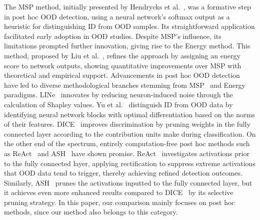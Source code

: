 The MSP method, initially presented by Hendrycks et al.~\cite{hendrycks2016msp}, was a formative step in post hoc OOD detection, using a neural network’s softmax output as a heuristic for distinguishing ID from OOD samples. Its straightforward application facilitated early adoption in OOD studies.
Despite MSP's influence, its limitations prompted further innovation, giving rise to the Energy method. This method, proposed by Liu et al.~\cite{liu2020energy}, refines the approach by assigning an energy score to network outputs, showing quantitative improvements over MSP with theoretical and empirical support.
Advancements in post hoc OOD detection have led to diverse methodological branches stemming from MSP~\cite{hendrycks2016baseline_confi} and Energy~\cite{liu2020energy} paradigms. LINe~\cite{ahn2023line} innovates by reducing neuron-induced noise through the calculation of Shapley values. Yu et al.~\cite{yu2023block} distinguish ID from OOD data by identifying neural network blocks with optimal differentiation based on the norms of their features. DICE~\cite{sun2022dice} improves discrimination by pruning weights in the fully connected layer according to the contribution units make during classification.
On the other end of the spectrum, entirely computation-free post hoc methods such as ReAct~\cite{sun2021react} and ASH~\cite{djurisic2022extremely} have shown promise. ReAct~\cite{sun2021react} investigates activations prior to the fully connected layer, applying rectification to suppress extreme activations that OOD data tend to trigger, thereby achieving refined detection outcomes. Similarly, ASH~\cite{djurisic2022extremely} prunes the activations inputted to the fully connected layer, but it achieves even more enhanced results compared to DICE~\cite{sun2022dice} by its selective pruning strategy. In this paper, our comparison mainly focuses on post hoc methods, since our method also belongs to this category.